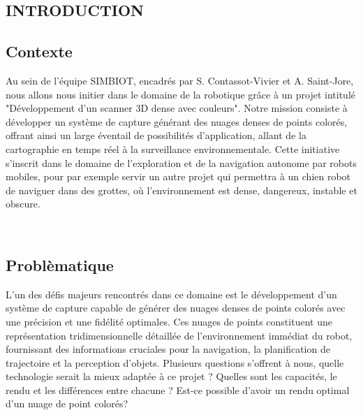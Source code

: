 \thispagestyle{empty} %
\begin{center}
    \section{\huge\textbf{{INTRODUCTION}}}  
\end{center}

\subsection{Contexte}
\normalsize{
    \setlength{\parindent}{1cm} %
    Au sein de l'équipe SIMBIOT, encadrés par S. Contassot-Vivier et A. Saint-Jore, nous allons nous initier dans le domaine de la robotique grâce à un projet intitulé "Développement d'un scanner 3D dense avec couleurs". Notre mission consiste à développer un système de capture générant des nuages denses de points colorés, offrant ainsi un large éventail de possibilités d'application, allant de la cartographie en temps réel à la surveillance environnementale. Cette initiative s'inscrit dans le domaine de l'exploration et de la navigation autonome par robots mobiles, pour par exemple servir un autre projet qui permettra à un chien robot de naviguer dans des grottes, où l'environnement est dense, dangereux, instable et obscure.
}


\\
\subsection{Problèmatique}

\normalsize{
    \setlength{\parindent}{1cm} %
    L'un des défis majeurs rencontrés dans ce domaine est le développement d'un système de capture capable de générer des nuages denses de points colorés avec une précision et une fidélité optimales. Ces nuages de points constituent une représentation tridimensionnelle détaillée de l'environnement immédiat du robot, fournissant des informations cruciales pour la navigation, la planification de trajectoire et la perception d'objets. Plusieurs questions s'offrent à nous, quelle technologie serait la mieux adaptée à ce projet ? Quelles sont les capacités, le rendu et les différences entre chacune ? Est-ce possible d'avoir un rendu optimal d'un nuage de point colorés?
}

\\
